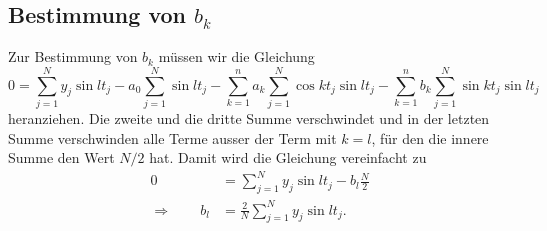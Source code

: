 \subsection{Bestimmung von $b_k$}
Zur Bestimmung von $b_k$ müssen wir die Gleichung
\[
0=\sum_{j=1}^N y_j\sin lt_j 
-a_0\sum_{j=1}^N \sin lt_j
-\sum_{k=1}^na_k\sum_{j=1}^N\cos kt_j\sin lt_j
-\sum_{k=1}^nb_k\sum_{j=1}^N\sin kt_j\sin lt_j
\]
heranziehen.
Die zweite und die dritte Summe verschwindet und in der letzten Summe
verschwinden alle Terme ausser der Term mit $k=l$, für den die
innere Summe den Wert $N/2$ hat.
Damit wird die Gleichung vereinfacht zu
\begin{align*}
0
&=
\sum_{j=1}^Ny_j\sin lt_j - b_l\frac{N}2
\\
\Rightarrow\qquad
b_l
&=
\frac{2}{N}\sum_{j=1}^Ny_j\sin lt_j.
\end{align*}

